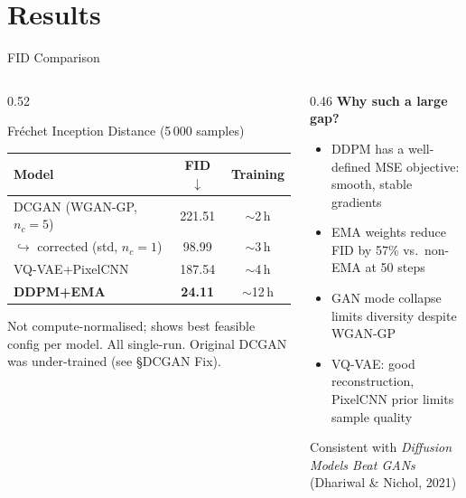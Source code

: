 \documentclass[aspectratio=169,10pt]{beamer}
\begin{document}
\section{Results}
%
\begin{frame}[shrink=5]{FID Comparison}
  \begin{columns}[T]
    \begin{column}{0.52\textwidth}
      \begin{block}{Fréchet Inception Distance (5\,000 samples)}
        \centering\vspace{3pt}
        \begin{tabular}{lcc}
          \toprule
          Model & FID $\downarrow$ & Training \\
          \midrule
          DCGAN (WGAN-GP, $n_c{=}5$) & 221.51 & $\sim$2\,h \\
          \quad$\hookrightarrow$ corrected (std, $n_c{=}1$) & 98.99 & $\sim$3\,h \\
          VQ-VAE+PixelCNN   & 187.54 & $\sim$4\,h \\
          \textbf{DDPM+EMA} & \textbf{24.11}  & $\sim$12\,h \\
          \bottomrule
        \end{tabular}\vspace{3pt}
      \end{block}
      \vspace{2pt}
      \footnotesize Not compute-normalised; shows best feasible config per model.
      All single-run. Original DCGAN was under-trained (see §DCGAN Fix).
    \end{column}
    \begin{column}{0.46\textwidth}
      \textbf{Why such a large gap?}
      \begin{itemize}
        \item DDPM has a well-defined MSE objective: smooth, stable gradients
        \item EMA weights reduce FID by 57\% vs.\ non-EMA at 50 steps
        \item GAN mode collapse limits diversity despite WGAN-GP
        \item VQ-VAE: good reconstruction, PixelCNN prior limits sample quality
      \end{itemize}
      \vspace{4pt}
      \footnotesize Consistent with \textit{Diffusion Models Beat GANs} (Dhariwal \& Nichol, 2021)
    \end{column}
  \end{columns}
\end{frame}
\end{document}
